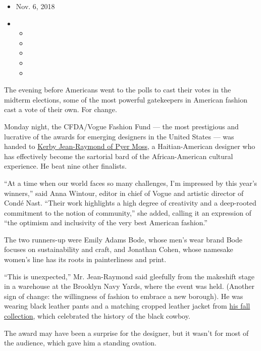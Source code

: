 \begin{itemize}
\item
  Nov. 6, 2018
\item
  \begin{itemize}
  \item
  \item
  \item
  \item
  \item
  \end{itemize}
\end{itemize}

The evening before Americans went to the polls to cast their votes in
the midterm elections, some of the most powerful gatekeepers in American
fashion cast a vote of their own. For change.

Monday night, the CFDA/Vogue Fashion Fund --- the most prestigious and
lucrative of the awards for emerging designers in the United States ---
was handed to
\href{https://www.nytimes3xbfgragh.onion/2018/10/11/magazine/kerby-jean-raymond-is-expanding-the-fashion-canon.html}{Kerby
Jean-Raymond of Pyer Moss}, a Haitian-American designer who has
effectively become the sartorial bard of the African-American cultural
experience. He beat nine other finalists.

``At a time when our world faces so many challenges, I'm impressed by
this year's winners,'' said Anna Wintour, editor in chief of Vogue and
artistic director of Condé Nast. ``Their work highlights a high degree
of creativity and a deep-rooted commitment to the notion of community,''
she added, calling it an expression of ``the optimism and inclusivity of
the very best American fashion.''

The two runners-up were Emily Adams Bode, whose men's wear brand Bode
focuses on sustainability and craft, and Jonathan Cohen, whose namesake
women's line has its roots in painterliness and print.

``This is unexpected,'' Mr. Jean-Raymond said gleefully from the
makeshift stage in a warehouse at the Brooklyn Navy Yards, where the
event was held. (Another sign of change: the willingness of fashion to
embrace a new borough). He was wearing black leather pants and a
matching cropped leather jacket from
\href{https://www.nytimes3xbfgragh.onion/slideshow/2018/02/10/fashion/runway-womens/pyer-moss-fall-2018.html}{his
fall collection}, which celebrated the history of the black cowboy.

The award may have been a surprise for the designer, but it wasn't for
most of the audience, which gave him a standing ovation.

